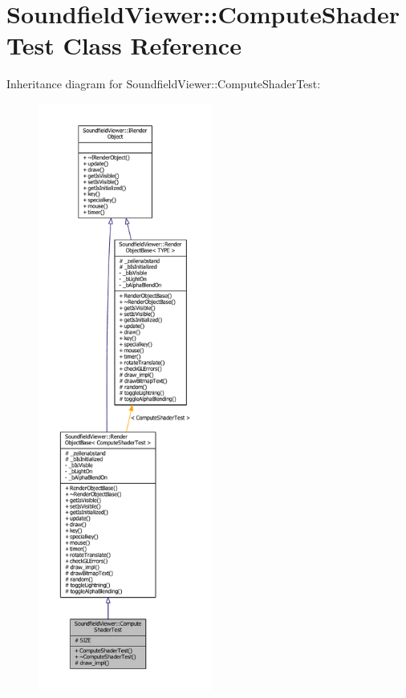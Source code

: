 \section{Soundfield\-Viewer\-:\-:Compute\-Shader\-Test Class Reference}
\label{classSoundfieldViewer_1_1ComputeShaderTest}


Inheritance diagram for Soundfield\-Viewer\-:\-:Compute\-Shader\-Test\-:\nopagebreak
\begin{figure}[H]
\begin{center}
\leavevmode
\includegraphics[height=550pt]{d0/db0/classSoundfieldViewer_1_1ComputeShaderTest__inherit__graph}
\end{center}
\end{figure}


